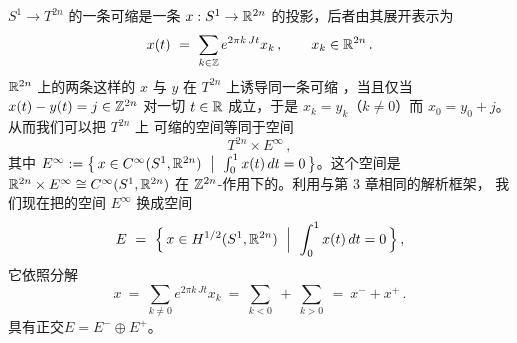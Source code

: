 $S^{1}\to T^{2n}$ 的一条可缩\trLoop{}是一条\trSmooth\trLoop{} $x:S^{1}\to\mathbb{R}^{2n}$%
的投影，后者由其\trFourier{}展开表示为
\begin{equation}\label{eq:torus-fourier}
x(t)\ =\ \sum_{k\in\mathbb{Z}}e^{2\pi k\,Jt}x_{k}\,,\qquad x_{k}\in\mathbb{R}^{2n}\,.
\end{equation}
$\mathbb{R}^{2n}$ 上的两条这样的\trLoop{} $x$ 与 $y$ 在 $T^{2n}$ 上诱导同一条可缩%
\trLoop，当且仅当 $x(t)-y(t)=j\in\mathbb{Z}^{2n}$ 对一切 $t\in\mathbb{R}$ 成立，于是%
$x_{k}=y_{k}$（$k\neq0$）而 $x_{0}=y_{0}+j$。从而我们可以把 $T^{2n}$ 上%
\trSmooth{}可缩\trLoop{}的空间等同于空间
\[
T^{2n}\times E^{\infty}\,,
\]
其中 $E^{\infty}:=\bigl\{\,x\in C^{\infty}(S^{1},\R^{2n})\ \bigm|\ \int_{0}^{1}%
x(t)\,dt=0\,\bigr\}$。这个空间是 $\R^{2n}\times E^{\infty}\cong C^{\infty}(S^{1},%
\R^{2n})$ 在 $\mathbb{Z}^{2n}$-作用下的\trQuotient。利用与第 3 章相同的解析框架，%
我们现在把\trSmooth\trLoop{}的空间 $E^{\infty}$ 换成\trSobolev{}空间
\begin{equation}\label{eq:torus-sobolev-e}
E\ =\ \Bigl\{\,x\in H^{1/2}(S^{1},\mathbb{R}^{2n})\ \Bigm|\ \int_{0}^{1}x(t)\,dt=0\,\Bigr\}\,,
\end{equation}
它依照分解
\[
x\ =\ \sum_{k\neq0}e^{2\pi k\,Jt}x_{k}\ =\ \sum_{k<0}\ +\ \sum_{k>0}\ =\ x^{-}+x^{+}\,.
\]
具有正交\trSplitting $E=E^{-}\oplus E^{+}$。


